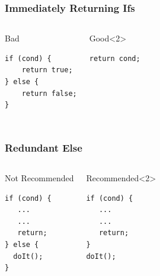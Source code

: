 \documentclass[screen]{beamer}
\newcommand{\badgood}[2]{%
	\begin{columns}%
		\column{.5\textwidth}%
		\begin{alertblock}{Bad}%
			#1%
		\end{alertblock}%
		\column{.5\textwidth}%
		\begin{exampleblock}{Good}%
			#2%
		\end{exampleblock}%
	\end{columns}%
}%
\begin{document}
\begin{frame}[fragile]
\frametitle{Immediately Returning Ifs}%
\begin{columns}
\begin{alertblock}{Bad}
\begin{lstlisting}
if (cond) {
    return true;
} else {
    return false;
}
\end{lstlisting}
\end{alertblock}
\begin{exampleblock}{Good}<2>
\begin{lstlisting}
return cond;
\end{lstlisting}
$\;$\\
$\;$\\
$\;$\\
$\;$\\
\end{exampleblock}
\end{columns}
\end{frame}

\begin{frame}[fragile]
\frametitle{Redundant Else}%
\begin{columns}
\begin{alertblock}{Not Recommended}
\begin{lstlisting}
if (cond) {
   ...
   ...
   return;
} else {
  doIt();
}
\end{lstlisting}
\end{alertblock}
\begin{exampleblock}{Recommended}<2>
\begin{lstlisting}
if (cond) {
   ...
   ...
   return;
}
doIt();
\end{lstlisting}
$\;$\\
\end{exampleblock}
\end{columns}
\end{frame}
\end{document}

